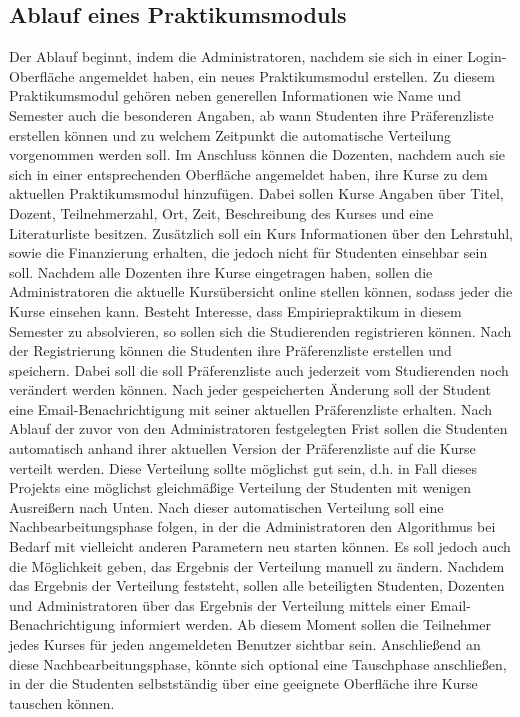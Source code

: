        \subsection{Ablauf eines Praktikumsmoduls}
            Der Ablauf beginnt, indem die Administratoren, nachdem sie sich in einer Login-Oberfläche angemeldet haben, ein neues Praktikumsmodul erstellen.
            Zu diesem Praktikumsmodul gehören neben generellen Informationen wie Name und Semester auch die besonderen Angaben, ab wann Studenten ihre Präferenzliste erstellen können und zu welchem Zeitpunkt die automatische Verteilung vorgenommen werden soll.
            Im Anschluss können die Dozenten, nachdem auch sie sich in einer entsprechenden Oberfläche angemeldet haben, ihre Kurse zu dem aktuellen Praktikumsmodul hinzufügen.
            Dabei sollen Kurse Angaben über Titel, Dozent, Teilnehmerzahl, Ort, Zeit, Beschreibung des Kurses und eine Literaturliste besitzen.
            Zusätzlich soll ein Kurs Informationen über den Lehrstuhl, sowie die Finanzierung erhalten, die jedoch nicht für Studenten einsehbar sein soll.
            Nachdem alle Dozenten ihre Kurse eingetragen haben, sollen die Administratoren die aktuelle Kursübersicht online stellen können, sodass jeder die Kurse einsehen kann.
            Besteht Interesse, dass Empiriepraktikum in diesem Semester zu absolvieren, so sollen sich die Studierenden registrieren können.
            Nach der Registrierung können die Studenten ihre Präferenzliste erstellen und speichern.
            Dabei soll die soll Präferenzliste auch jederzeit vom Studierenden noch verändert werden können.
            Nach jeder gespeicherten Änderung soll der Student eine Email-Benachrichtigung mit seiner aktuellen Präferenzliste erhalten.
            Nach Ablauf der zuvor von den Administratoren festgelegten Frist sollen die Studenten automatisch anhand ihrer aktuellen Version der Präferenzliste auf die Kurse verteilt werden.
            Diese Verteilung sollte möglichst gut sein, d.h. in Fall dieses Projekts eine möglichst gleichmäßige Verteilung der Studenten mit wenigen Ausreißern nach Unten.
            Nach dieser automatischen Verteilung soll eine Nachbearbeitungsphase folgen, in der die Administratoren den Algorithmus bei Bedarf mit vielleicht anderen Parametern neu starten können.
            Es soll jedoch auch die Möglichkeit geben, das Ergebnis der Verteilung manuell zu ändern.
            Nachdem das Ergebnis der Verteilung feststeht, sollen alle beteiligten Studenten, Dozenten und Administratoren über das Ergebnis der Verteilung mittels einer Email-Benachrichtigung informiert werden.
            Ab diesem Moment sollen die Teilnehmer jedes Kurses für jeden angemeldeten Benutzer sichtbar sein.
            Anschließend an diese Nachbearbeitungsphase, könnte sich optional eine Tauschphase anschließen, in der die Studenten selbstständig über eine geeignete Oberfläche ihre Kurse tauschen können.
            

